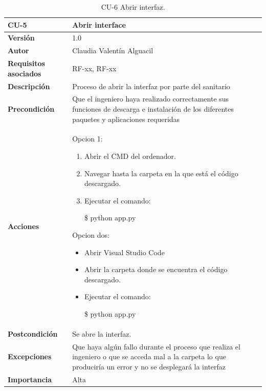 \begin{table}[p]
	\centering
	\begin{tabularx}{\linewidth}{ p{} p{} }
		\toprule
		\textbf{CU-5}    & \textbf{Abrir interface}\\
		\toprule
		\textbf{Versión}              & 1.0    \\
		\textbf{Autor}                & Claudia Valentín Alguacil \\
		\textbf{Requisitos asociados} & RF-xx, RF-xx \\
		\textbf{Descripción}          & Proceso de abrir la interfaz por parte del sanitario \\
		\textbf{Precondición}         & Que el ingeniero haya realizado correctamente sus funciones de descarga e instalación de los diferentes paquetes y aplicaciones requeridas \\
		\textbf{Acciones}             &
        Opcion 1: 
		\begin{enumerate}
			\def\labelenumi{\arabic{enumi}.}
			\tightlist
			\item Abrir el CMD del ordenador.
			\item Navegar hasta la carpeta en la que está el código descargado.
                \item Ejecutar el comando:
                
                \$ python app.py
		\end{enumerate}
        Opcion dos:
        \begin{itemize}
        \def\labelenumi{\arabic{enumi}.}
		  \tightlist
            \item Abrir Visual Studio Code
            \item Abrir la carpeta donde se encuentra el código descargado.
            \item Ejecutar el comando:
                
            \$ python app.py
        \end{itemize} \\
		\textbf{Postcondición}        &  Se abre la interfaz. \\
		\textbf{Excepciones}          & Que haya algún fallo durante el proceso que realiza el ingeniero o que se acceda mal a la carpeta lo que produciría un error y no se desplegará la interfaz \\
		\textbf{Importancia}          & Alta \\
		\bottomrule
	\end{tabularx}
	\caption{CU-6 Abrir interfaz.}
\end{table}

